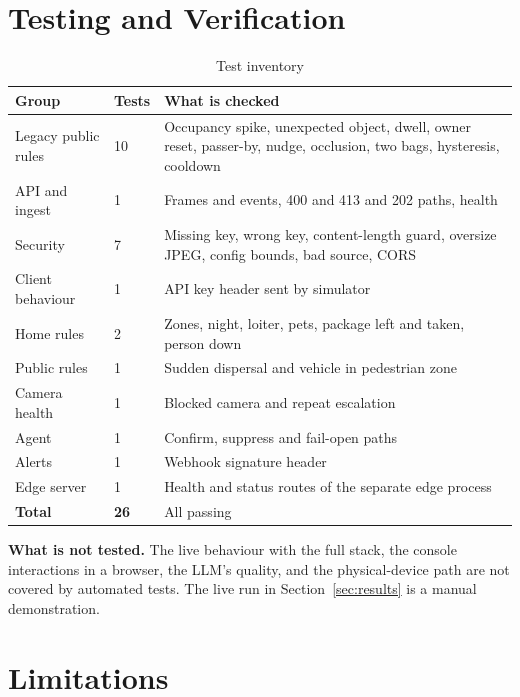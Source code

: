 \documentclass[11pt]{article}
\begin{document}
\section{Testing and Verification}

\begin{table}[H]
\centering\small
\caption{Test inventory}
\label{tab:ieee_34}
\begin{tabularx}{\textwidth}{|L{4.6cm}|L{1.4cm}|Y|}
\hline
{} \textbf{Group} & \textbf{Tests} & \textbf{What is checked} \\ \hline
Legacy public rules & 10 & Occupancy spike, unexpected object, dwell, owner reset, passer-by, nudge, occlusion, two bags, hysteresis, cooldown \\ \hline
API and ingest & 1 & Frames and events, 400 and 413 and 202 paths, health \\ \hline
Security & 7 & Missing key, wrong key, content-length guard, oversize JPEG, config bounds, bad source, CORS \\ \hline
Client behaviour & 1 & API key header sent by simulator \\ \hline
Home rules & 2 & Zones, night, loiter, pets, package left and taken, person down \\ \hline
Public rules & 1 & Sudden dispersal and vehicle in pedestrian zone \\ \hline
Camera health & 1 & Blocked camera and repeat escalation \\ \hline
Agent & 1 & Confirm, suppress and fail-open paths \\ \hline
Alerts & 1 & Webhook signature header \\ \hline
Edge server & 1 & Health and status routes of the separate edge process \\ \hline
\textbf{Total} & \textbf{26} & All passing \\ \hline
\end{tabularx}
\end{table}

\textbf{What is not tested.} The live behaviour with the full stack, the console interactions in a browser, the LLM's quality, and the physical-device path are not covered by automated tests. The live run in Section~\ref{sec:results} is a manual demonstration.

\section{Limitations}\label{sec:limits}
\end{document}

